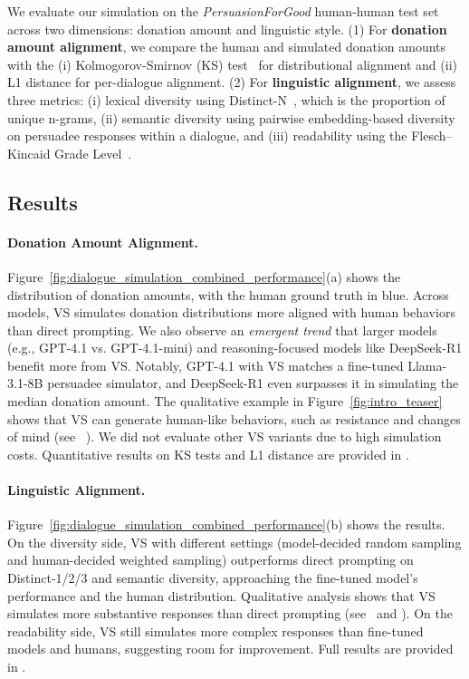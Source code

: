 We evaluate our simulation on the \textit{PersuasionForGood} human-human test set across two dimensions: donation amount and linguistic style. (1) For \textbf{donation amount alignment}, we compare the human and simulated donation amounts with the (i) Kolmogorov-Smirnov (KS) test~\citep{ks-test} for distributional alignment and (ii) L1 distance for per-dialogue alignment. (2) For \textbf{linguistic alignment}, we assess three metrics: (i) lexical diversity using Distinct-N~\citep{li-etal-2016-diversity}, which is the proportion of unique n-grams, (ii) semantic diversity using pairwise embedding-based diversity on persuadee responses within a dialogue, and (iii) readability using the Flesch–Kincaid Grade Level~\citep{flesch1948new}.


\vspace{-0.5em}

\subsection{Results}
\vspace{-0.5em}
\paragraph{Donation Amount Alignment.} Figure~\ref{fig:dialogue_simulation_combined_performance}(a) shows the distribution of donation amounts, with the human ground truth in blue. Across models, VS simulates donation distributions more aligned with human behaviors than direct prompting. We also observe an \emph{emergent trend} that larger models (e.g., GPT-4.1 vs. GPT-4.1-mini) and reasoning-focused models like DeepSeek-R1 benefit more from VS. Notably, GPT-4.1 with VS matches a fine-tuned Llama-3.1-8B persuadee simulator, and DeepSeek-R1 even surpasses it in simulating the median donation amount. The qualitative example in Figure~\ref{fig:intro_teaser} shows that VS can generate human-like behaviors, such as resistance and changes of mind (see ~). We did not evaluate other VS variants due to high simulation costs. Quantitative results on KS tests and L1 distance are provided in . 

\paragraph{Linguistic Alignment.}  Figure~\ref{fig:dialogue_simulation_combined_performance}(b) shows the results. On the diversity side,  VS with different settings (model-decided random sampling and human-decided weighted sampling) outperforms direct prompting on Distinct-1/2/3 and semantic diversity,  approaching the fine-tuned model's performance and the human distribution. 
Qualitative analysis shows that VS simulates more substantive responses than direct prompting %
(see~ and ).
On the readability side, VS  still simulates more complex responses than fine-tuned models and humans, suggesting room for improvement. 
Full results are provided in .

